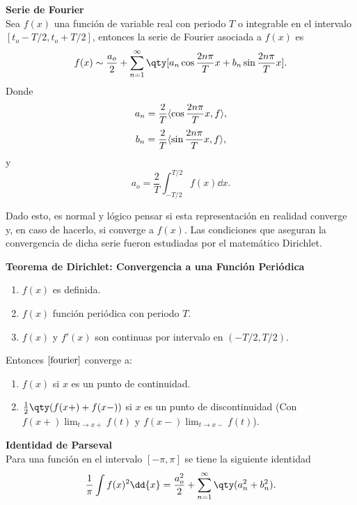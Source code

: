 \begin{mdframed}[style=warning]
	{\large \textbf{Serie de Fourier}} \\
	Sea $f(x)$ una función de variable real con periodo $T$ o integrable en el intervalo $[t_o - T/2,t_o + T/2]$, entonces la serie de Fourier asociada a $f(x)$ es
	\begin{equation}
		f(x) \sim \frac{a_o}{2} + \sum _{n = 1} ^\infty \qty[a_n \cos{\frac{2n\pi}{T} x} + b_n \sin{\frac{2n\pi}{T} x}]. \label{fourier}
	\end{equation}
	Donde
		$$ a_n = \frac{2}{T} \langle \cos{\frac{2n\pi}{T} x} , f \rangle, $$
		$$ b_n = \frac{2}{T} \langle \sin{\frac{2n\pi}{T} x} , f \rangle, $$
	y
		$$ a_o = \frac{2}{T} \int _{-T/2} ^{T/2} f(x) \dd{x}. $$
	
\end{mdframed}


Dado esto, es normal y lógico pensar si esta representación en realidad converge y, en caso de hacerlo, si converge a $f(x)$. Las condiciones que aseguran la convergencia de dicha serie fueron estudiadas por el matemático Dirichlet.



\begin{mdframed}[style=warning]
	{\large \textbf{Teorema de Dirichlet: Convergencia a una Función Periódica}}
	\begin{enumerate}
		\item $f(x)$ es definida.
		\item $f(x)$ función periódica con periodo $T$.
		\item $f(x)$ y $f'(x)$ son continuas por intervalo en $(-T/2,T/2)$.
	\end{enumerate}
	Entonces $\eqref{fourier}$ converge a:
	\begin{enumerate}
		\item $f(x)$ si $x$ es un punto de continuidad.
		\item $\frac{1}{2} \qty(f(x+) + f(x-))$ si $x$ es un punto de discontinuidad (Con $f(x+) \displaystyle\lim _{t \to x+} f(t)$ y $f(x-) \displaystyle\lim _{t \to x-} f(t)$).
	\end{enumerate}
	
\end{mdframed}






\begin{mdframed}[style=warning]
	{\large \textbf{Identidad de Parseval}} \\
	Para una función en el intervalo $[-\pi ,\pi]$ se tiene la siguiente identidad
		$$ \frac{1}{\pi} \int f(x) ^2 \dd{x} = \frac{a_o ^2}{2} + \sum _{n = 1} ^\infty \qty(a_n ^2 + b_n ^2). $$	
\end{mdframed}



